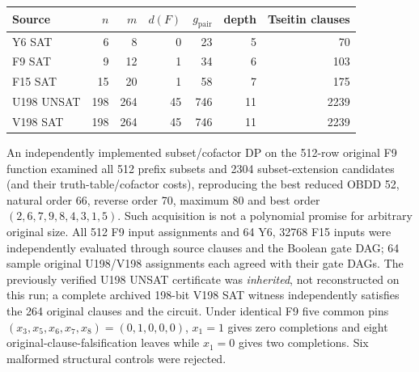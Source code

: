 \documentclass[11pt]{article}
\begin{document}
\begin{center}\small
\begin{tabular}{lrrrrrr}
\toprule
Source & $n$ & $m$ & $d(F)$ & $g_{\mathrm{pair}}$ & depth & Tseitin clauses\\
\midrule
Y6 SAT & 6 & 8 & 0 & 23 & 5 & 70\\
F9 SAT & 9 & 12 & 1 & 34 & 6 & 103\\
F15 SAT & 15 & 20 & 1 & 58 & 7 & 175\\
U198 UNSAT & 198 & 264 & 45 & 746 & 11 & 2239\\
V198 SAT & 198 & 264 & 45 & 746 & 11 & 2239\\
\bottomrule
\end{tabular}
\end{center}
An independently implemented subset/cofactor DP on the 512-row original F9 function examined all 512 prefix subsets and 2304 subset-extension candidates (and their truth-table/cofactor costs), reproducing the best reduced OBDD 52, natural order 66, reverse order 70, maximum 80 and best order $(2,6,7,9,8,4,3,1,5)$. Such acquisition is not a polynomial promise for arbitrary original size. All 512 F9 input assignments and 64 Y6, 32768 F15 inputs were independently evaluated through source clauses and the Boolean gate DAG; 64 sample original U198/V198 assignments each agreed with their gate DAGs. The previously verified U198 UNSAT certificate was \emph{inherited}, not reconstructed on this run; a complete archived 198-bit V198 SAT witness independently satisfies the 264 original clauses and the circuit. Under identical F9 five common pins $(x_3,x_5,x_6,x_7,x_8)=(0,1,0,0,0)$, $x_1=1$ gives zero completions and eight original-clause-falsification leaves while $x_1=0$ gives two completions. Six malformed structural controls were rejected.
\end{document}
